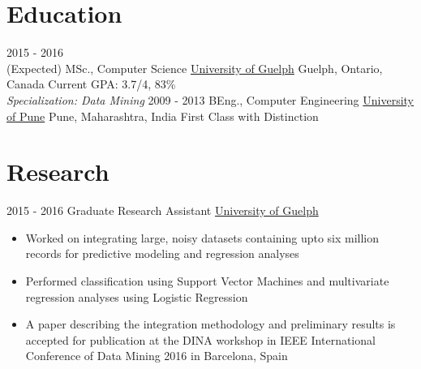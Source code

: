 \documentclass[letterpaper]{twentysecondcv} %
\begin{document}
\makeprofile %

\section{Education}

\begin{twenty} %
	\twentyitem
    	{2015 - 2016 \\ (Expected)}
        {MSc., Computer Science}
        {\href{http://www.uoguelph.ca/}{University of Guelph}}
        {Guelph, Ontario, Canada}
        {Current GPA: 3.7/4, 83\% \\ \textit{Specialization: Data Mining}}
	\twentyitem
    	{2009 - 2013}
        {BEng., Computer Engineering}
        {\href{http://www.unipune.ac.in/}{University of Pune}}
        {Pune, Maharashtra, India}
        {First Class with Distinction}
\end{twenty}


\section{Research}
\begin{twenty}
	\twentyitem
    	{2015 - 2016}
        {Graduate Research Assistant}
        {\href{http://www.uoguelph.ca/}{University of Guelph}}
        {}
        {
        {\begin{itemize}
        \item Worked on integrating large, noisy datasets containing upto six million records for predictive modeling and regression analyses
        \item Performed classification using Support Vector Machines and multivariate regression analyses using Logistic Regression
        \item A paper describing the integration methodology and preliminary results is accepted for publication at the DINA workshop in IEEE International Conference of Data Mining 2016 in Barcelona, Spain
    \end{itemize}}
        }
\end{twenty}

\end{document}
